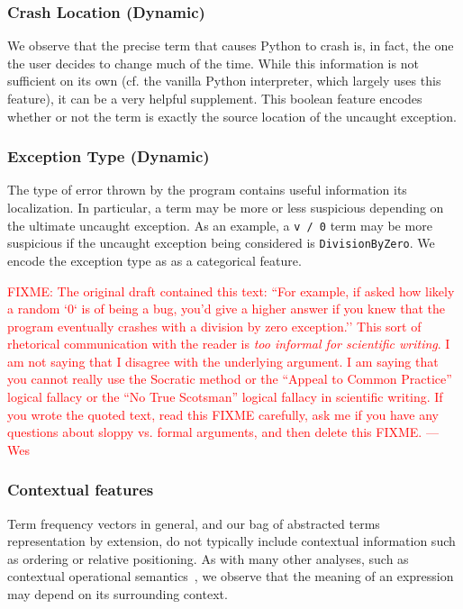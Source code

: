 \documentclass[conference]{IEEEtran}
\newcommand{\fixme}[1]{\textcolor{red}{FIXME: #1}}
\newcommand\lt[1]{{\lstinline|#1|}}
\begin{document}
\subsubsection{Crash Location (Dynamic)} We observe that the precise term that
causes Python to crash is, in fact, the one the user decides to change
much of the time. While this information is not sufficient on its own
(cf. the vanilla Python interpreter, which largely uses this feature), 
it can be a very helpful supplement. This boolean feature encodes whether
or not the term is exactly the source location of the uncaught exception. 

\subsubsection{Exception Type (Dynamic)} The type of error thrown by the program
contains useful information its localization. In particular, a term may be
more or less suspicious depending on the ultimate uncaught exception. As an
example, a \lt{v / 0} term may be more suspicious if the uncaught exception
being considered is \lt{DivisionByZero}. We encode the exception type as
as a categorical feature. 

\fixme{The original draft contained this text: ``For example, if asked how
likely a random `0` is of being a bug, you'd give a higher answer if you
knew that the program eventually crashes with a division by zero exception.''
This sort of rhetorical communication with the reader is \emph{too
informal for scientific writing}. I am not saying that I disagree with the
underlying argument. I am saying that you cannot really use the Socratic
method or the ``Appeal to Common Practice'' logical fallacy or the ``No
True Scotsman'' logical fallacy in scientific writing. If you wrote the
quoted text, read this FIXME carefully, ask me if you have any questions
about sloppy vs. formal arguments, and then delete this FIXME. --- Wes} 

\subsubsection{Contextual features}

Term frequency vectors in general, and our bag of abstracted terms
representation by extension, do not typically include contextual
information such as ordering or relative positioning. As with many other
analyses, such as contextual operational semantics~\cite{FIXME}, we observe 
that the meaning of an expression may depend on its surrounding context. 
\end{document}
